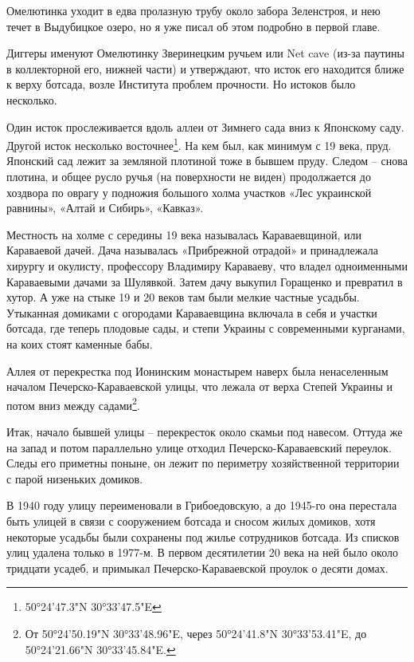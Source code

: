 Омелютинка уходит в едва пролазную трубу около забора Зеленстроя, и нею течет в Выдубицкое озеро, но я уже писал об этом подробно в первой главе.

Диггеры именуют Омелютинку Зверинецким ручьем или Net cave (из-за паутины в коллекторной его, нижней части) и утверждают, что исток его находится ближе к верху ботсада, возле Института проблем прочности. Но истоков было несколько.

Один исток прослеживается вдоль аллеи от Зимнего сада вниз к Японскому саду. Другой исток несколько восточнее\footnote{50°24'47.3"N 30°33'47.5"E}. На кем был, как минимум с 19 века, пруд. Японский сад лежит за земляной плотиной тоже в бывшем пруду. Следом – снова плотина, и общее русло ручья (на поверхности не виден) продолжается до хоздвора по оврагу у подножия большого холма участков «Лес украинской равнины», «Алтай и Сибирь», «Кавказ».


Местность на холме с середины 19 века называлась Караваевщиной, или Караваевой дачей. Дача называлась «Прибрежной отрадой» и принадлежала хирургу и окулисту, профессору Владимиру Караваеву, что владел одноименными Караваевыми дачами за Шулявкой. Затем дачу выкупил Горащенко и превратил в хутор. А уже на стыке 19 и 20 веков там были  мелкие частные усадьбы. Утыканная домиками с огородами Караваевщина включала в себя и участки ботсада, где теперь плодовые сады, и степи Украины с современными  курганами, на коих стоят каменные бабы.

Аллея от перекрестка под Ионинским монастырем наверх была ненаселенным началом Печерско-Караваевской улицы, что лежала от верха Степей Украины и потом вниз между садами\footnote{От 50°24'50.19"N 30°33'48.96"E, через 50°24'41.8"N 30°33'53.41"E, до 50°24'21.66"N 30°33'45.84"E.}. 

Итак, начало бывшей улицы – перекресток около скамьи под навесом. Оттуда же на запад и потом параллельно улице отходил Печерско-Караваевский переулок. Следы его приметны поныне, он лежит по периметру хозяйственной территории с парой низеньких домиков.

В 1940 году улицу переименовали в Грибоедовскую, а до 1945-го она перестала быть улицей в связи с сооружением ботсада и сносом жилых домиков, хотя некоторые усадьбы были сохранены под жилье сотрудников ботсада. Из списков улиц удалена только в 1977-м. В первом десятилетии 20 века на ней было около тридцати усадеб, и примыкал Печерско-Караваевской проулок о десяти домах.

